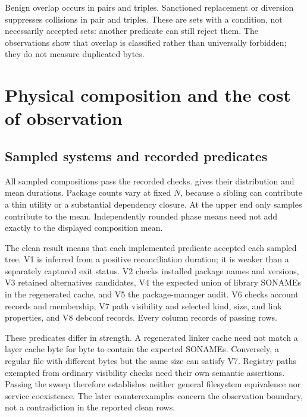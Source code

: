 Benign overlap occurs in  pairs and  triples. Sanctioned replacement or diversion suppresses collisions in  pair and  triples. These are sets with a condition, not necessarily accepted sets: another predicate can still reject them. The observations show that overlap is classified rather than universally forbidden; they do not measure duplicated bytes.

\section{Physical composition and the cost of observation}

\subsection{Sampled systems and recorded predicates}

All  sampled compositions pass the recorded checks.  gives their distribution and mean durations. Package counts vary at fixed $N$, because a sibling can contribute a thin utility or a substantial dependency closure. At the upper end only  samples contribute to the mean. Independently rounded phase means need not add exactly to the displayed composition mean.



The clean result means that each implemented predicate accepted each sampled tree. V1 is inferred from a positive reconciliation duration; it is weaker than a separately captured exit status. V2 checks installed package names and versions, V3 retained alternatives candidates, V4 the expected union of library \acp{SONAME} in the regenerated cache, and V5 the package-manager audit. V6 checks account records and membership, V7 path visibility and selected kind, size, and link properties, and V8 debconf records. Every column records  of  passing rows.

These predicates differ in strength. A regenerated linker cache need not match a layer cache byte for byte to contain the expected \acp{SONAME}. Conversely, a regular file with different bytes but the same size can satisfy V7. Registry paths exempted from ordinary visibility checks need their own semantic assertions. Passing the sweep therefore establishes neither general filesystem equivalence nor service coexistence. The later counterexamples concern the observation boundary, not a contradiction in the reported clean rows.


